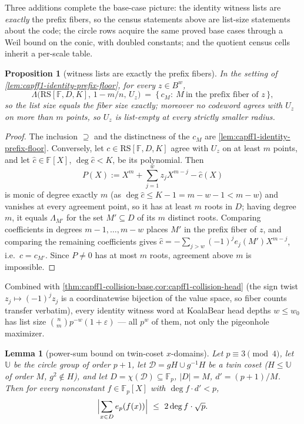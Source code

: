 \documentclass[11pt]{article}
\newtheorem{lemma}[lemma]{Lemma}
\newtheorem{proposition}[proposition]{Proposition}
\theoremstyle{definition}
\theoremstyle{remark}
\newcommand{\F}{\mathbb{F}}
\newcommand{\B}{B}
\newcommand{\RS}{\mathrm{RS}}
\newcommand{\Lst}{\Lambda}
\newcommand{\UU}{\mathbb{U}}
\begin{document}
Three additions complete the base-case picture: the identity witness lists are \emph{exactly} the prefix fibers, so the census statements above are list-size statements about the code; the circle rows acquire the same proved base cases through a Weil bound on the conic, with doubled constants; and the quotient census cells inherit a per-scale table.

\begin{proposition}[witness lists are exactly the prefix fibers]\label{prop:capff1-witness-exact}
In the setting of \cref{lem:capff1-identity-prefix-floor}, for \emph{every} $z\in\B^w$,
\[
        \Lst\bigl(\RS[\F,D,K],\,1-m/n,\,U_z\bigr)\ =\ \{\,c_M:\ M\ \text{in the prefix fiber of }z\,\},
\]
so the list size equals the fiber size exactly; moreover no codeword agrees with $U_z$ on more than $m$ points, so $U_z$ is list-empty at every strictly smaller radius.
\end{proposition}

\begin{proof}
The inclusion $\supseteq$ and the distinctness of the $c_M$ are \cref{lem:capff1-identity-prefix-floor}.  Conversely, let $c\in\RS[\F,D,K]$ agree with $U_z$ on at least $m$ points, and let $\hat c\in\F[X]$, $\deg\hat c<K$, be its polynomial.  Then
\[
        P(X):=X^m+\sum_{j=1}^{w}z_jX^{m-j}-\hat c(X)
\]
is monic of degree exactly $m$ \textup{(as $\deg\hat c\le K-1=m-w-1<m-w$)} and vanishes at every agreement point, so it has at least $m$ roots in $D$; having degree $m$, it equals $\Lambda_{M'}$ for the set $M'\subseteq D$ of its $m$ distinct roots.  Comparing coefficients in degrees $m-1,\ldots,m-w$ places $M'$ in the prefix fiber of $z$, and comparing the remaining coefficients gives $\hat c=-\sum_{j>w}(-1)^je_j(M')X^{m-j}$, i.e.\ $c=c_{M'}$.  Since $P\ne0$ has at most $m$ roots, agreement above $m$ is impossible.
\end{proof}

Combined with \cref{thm:capff1-collision-base,cor:capff1-collision-head} \textup{(the sign twist $z_j\mapsto(-1)^jz_j$ is a coordinatewise bijection of the value space, so fiber counts transfer verbatim)}, every identity witness word at KoalaBear head depths $w\le w_0$ has list size $\binom nm p^{-w}(1+\varepsilon)$ --- all $p^w$ of them, not only the pigeonhole maximizer.

\begin{lemma}[power-sum bound on twin-coset $x$-domains]\label{lem:capff1-torus-weil}
Let $p\equiv3\pmod4$, let $\UU$ be the circle group of order $p+1$, let $\mathcal D=gH\cup g^{-1}H$ be a twin coset \textup{($H\le\UU$ of order $M$, $g^2\notin H$)}, and let $D=\chi(\mathcal D)\subseteq\F_p$, $|D|=M$, $d'=(p+1)/M$.  Then for every nonconstant $f\in\F_p[X]$ with $\deg f\cdot d'<p$,
\[
        \Bigl|\sum_{x\in D}e_p(f(x))\Bigr|\ \le\ 2\deg f\cdot\sqrt p.
\]
\end{lemma}
\end{document}

